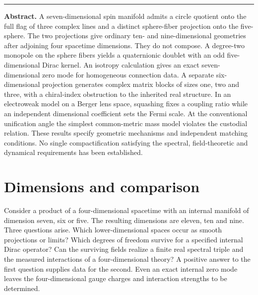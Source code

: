 \documentclass[11pt,oneside]{article}
\begin{document}
\thispagestyle{plain}
\par
\vspace{.52cm}
\vspace{.38cm}\noindent\rule{.22\linewidth}{1.2pt}\par
\smallskip\noindent\textbf{Abstract.}
A seven-dimensional spin manifold admits a circle quotient onto the full flag of three complex lines and a distinct sphere-fiber projection onto the five-sphere. The two projections give ordinary ten- and nine-dimensional geometries after adjoining four spacetime dimensions. They do not compose. A degree-two monopole on the sphere fibers yields a quaternionic doublet with an odd five-dimensional Dirac kernel. An isotropy calculation gives an exact seven-dimensional zero mode for homogeneous connection data. A separate six-dimensional projection generates complex matrix blocks of sizes one, two and three, with a chiral-index obstruction to the inherited real structure. In an electroweak model on a Berger lens space, squashing fixes a coupling ratio while an independent dimensional coefficient sets the Fermi scale. At the conventional unification angle the simplest common-metric mass model violates the custodial relation. These results specify geometric mechanisms and independent matching conditions. No single compactification satisfying the spectral, field-theoretic and dynamical requirements has been established.

\clearpage
\section{Dimensions and comparison}
Consider a product of a four-dimensional spacetime with an internal manifold of dimension seven, six or five. The resulting dimensions are eleven, ten and nine. Three questions arise. Which lower-dimensional spaces occur as smooth projections or limits? Which degrees of freedom survive for a specified internal Dirac operator? Can the surviving fields realize a finite real spectral triple and the measured interactions of a four-dimensional theory? A positive answer to the first question supplies data for the second. Even an exact internal zero mode leaves the four-dimensional gauge charges and interaction strengths to be determined.
\end{document}
